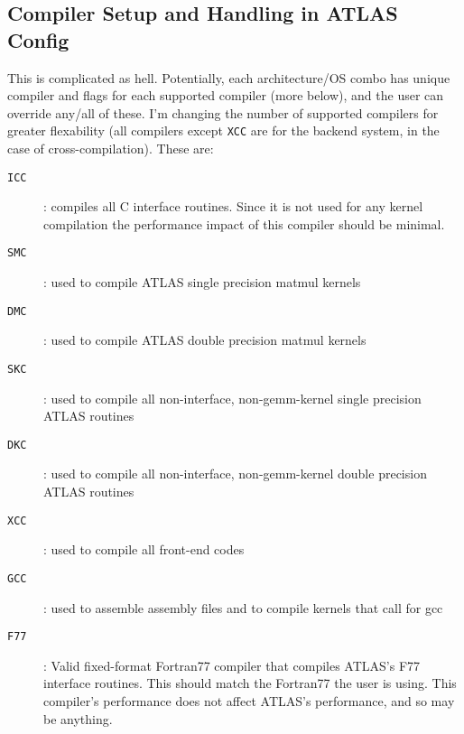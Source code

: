 \documentclass[11pt]{article}
\begin{document}
\subsection{Compiler Setup and Handling in ATLAS Config}
\label{sec-compProbe}

This is complicated as hell.  Potentially, each architecture/OS combo has
unique compiler and flags for each supported compiler (more below), and the 
user can override any/all of these.  I'm changing the number of supported
compilers for greater flexability (all compilers except {\tt XCC} are
for the backend system, in the case of cross-compilation).  These are:
\begin{description}
\item [{\tt ICC}] : compiles all C interface routines.
      Since it is not used for any kernel compilation
      the performance impact of this compiler should be minimal.
\item [{\tt SMC}] : used to compile ATLAS single precision matmul kernels
\item [{\tt DMC}] : used to compile ATLAS double precision matmul kernels
\item [{\tt SKC}] : used to compile all non-interface, non-gemm-kernel
                    single precision ATLAS routines
\item [{\tt DKC}] : used to compile all non-interface, non-gemm-kernel
                    double precision ATLAS routines
\item [{\tt XCC}] : used to compile all front-end codes
\item [{\tt GCC}] : used to assemble assembly files and to compile kernels
                    that call for gcc
\item [{\tt F77}] : Valid fixed-format Fortran77 compiler that compiles
      ATLAS's F77 interface routines.  This should match the Fortran77
      the user is using.  This compiler's performance
      does not affect ATLAS's performance, and so may be anything.
\end{description}

\end{document}
